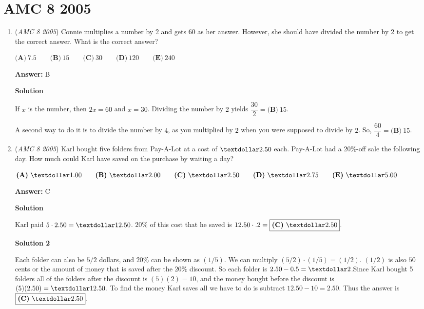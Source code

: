 \section{AMC 8 2005}
        \begin{enumerate}
        	\item (\textit{AMC 8 2005}) Connie multiplies a number by 2 and gets 60 as her answer. However, she should
have divided the number by 2 to get the correct answer. What is the correct
answer?


 $\textbf{(A)}\ 7.5\qquad\textbf{(B)}\ 15\qquad\textbf{(C)}\ 30\qquad\textbf{(D)}\ 120\qquad\textbf{(E)}\ 240$

 \textbf{Answer: }B



\textbf{Solution}

If $x$ is the number, then $2x=60$ and $x=30$. Dividing the number by $2$ yields $\dfrac{30}{2} = \boxed{\textbf{(B)}\ 15}$.

 A second way to do it is to divide the number by $4$, as you multiplied by $2$ when you were supposed to divide by $2$. So, $\dfrac{60}{4} = \boxed{\textbf{(B)}\ 15}$.

 


	\item (\textit{AMC 8 2005}) Karl bought five folders from Pay-A-Lot at a cost of $\textdollar 2.50$ each.
Pay-A-Lot had a 20\%-off sale the following day. How much could
Karl have saved on the purchase by waiting a day?


 $\textbf{(A)}\ \textdollar 1.00  \qquad\textbf{(B)}\ \textdollar 2.00 \qquad\textbf{(C)}\ \textdollar 2.50\qquad\textbf{(D)}\ \textdollar 2.75 \qquad\textbf{(E)}\ \textdollar 5.00$

 \textbf{Answer: }C



\textbf{Solution}

Karl paid $5 \cdot 2.50 = \textdollar 12.50$. $20 \%$ of this cost that he saved is $12.50 \cdot .2 = \boxed{\textbf{(C)}\ \textdollar 2.50}$.

 



\textbf{Solution 2}

Each folder can also be $5/2$ dollars, and $20\%$ can be shown as $(1/5)$. We can multiply $(5/2) \cdot (1/5) = (1/2)$. $(1/2)$  is also $50$ cents or the amount of money that is saved after the $20\%$ discount. So each folder is $2.50-0.5 = \textdollar2$.Since Karl bought 5 folders all of the folders after the discount is $(5)(2) = 10$, and the money bought before the discount is $(5)(2.50) = \textdollar12.50$. To find the money Karl saves all we have to do is subtract $12.50 - 10 = 2.50$. Thus the answer is  $\boxed{\textbf{(C)}\ \textdollar 2.50}$.


\end{enumerate}
